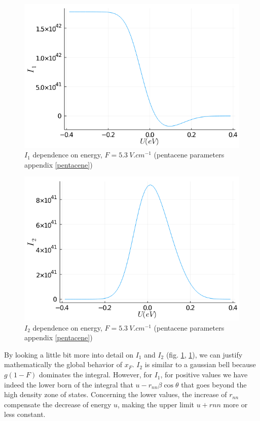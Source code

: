 \begin{figure}[!h]
    \centering
    \includegraphics*[width=.5\paperwidth]{figures/3_elec/I1.png}
    \caption{$I_1$ dependence on energy, $F = \SI{5.3}{V . cm^{-1}}$ (pentacene parameters appendix \ref{pentacene})\label{fig:3_5}}
\end{figure}


\begin{figure}[!h]
    \centering
    \includegraphics*[width=.5\paperwidth]{figures/3_elec/I2.png}
    \caption{$I_2$ dependence on energy, $F = \SI{5.3}{V . cm^{-1}}$ (pentacene parameters appendix \ref{pentacene})\label{fig:3_6}}
\end{figure}

By looking a little bit more into detail on $I_1$ and $I_2$ (fig. \ref{fig:3_5}, \ref{fig:3_5}), we can justify mathematically the global behavior of $x_F$. $I_2$ is similar to a gaussian bell because $g(1-F)$ dominates the integral. However, for $I_1$, for positive values we have indeed the lower born of the integral that $u - r_{nn}\beta \cos \theta$ that goes beyond the high density zone of states. Concerning the lower values, the increase of $r_{nn}$ compensate the decrease of energy $u$, making the upper limit $u + rnn$ more or less constant.

